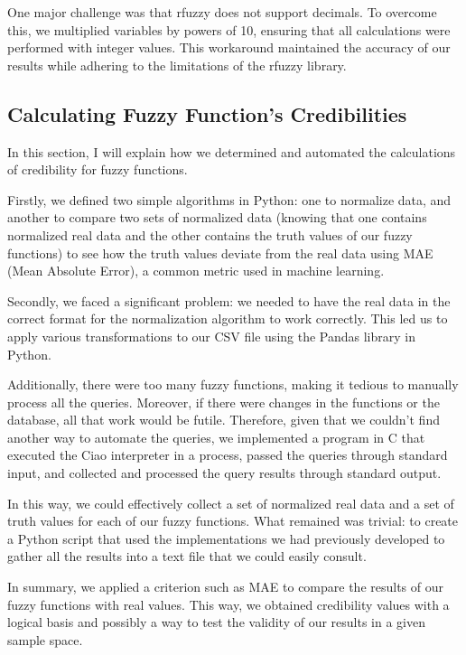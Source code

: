 \documentclass[fleqn,11pt]{article}
\begin{document}
One major challenge was that rfuzzy does not support decimals. To overcome this, we multiplied variables by powers of 10, ensuring that all calculations were performed with integer values. This workaround maintained the accuracy of our results while adhering to the limitations of the rfuzzy library.

\subsection{Calculating Fuzzy Function's Credibilities}

In this section, I will explain how we determined and automated the calculations of credibility for fuzzy functions.

Firstly, we defined two simple algorithms in Python: one to normalize data, and another to compare two sets of normalized data (knowing that one contains normalized real data and the other contains the truth values of our fuzzy functions) to see how the truth values deviate from the real data using MAE (Mean Absolute Error), a common metric used in machine learning.

Secondly, we faced a significant problem: we needed to have the real data in the correct format for the normalization algorithm to work correctly. This led us to apply various transformations to our CSV file using the Pandas library in Python.

Additionally, there were too many fuzzy functions, making it tedious to manually process all the queries. Moreover, if there were changes in the functions or the database, all that work would be futile. Therefore, given that we couldn't find another way to automate the queries, we implemented a program in C that executed the Ciao interpreter in a process, passed the queries through standard input, and collected and processed the query results through standard output.

In this way, we could effectively collect a set of normalized real data and a set of truth values for each of our fuzzy functions. What remained was trivial: to create a Python script that used the implementations we had previously developed to gather all the results into a text file that we could easily consult.

In summary, we applied a criterion such as MAE to compare the results of our fuzzy functions with real values. This way, we obtained credibility values with a logical basis and possibly a way to test the validity of our results in a given sample space.
\end{document}
